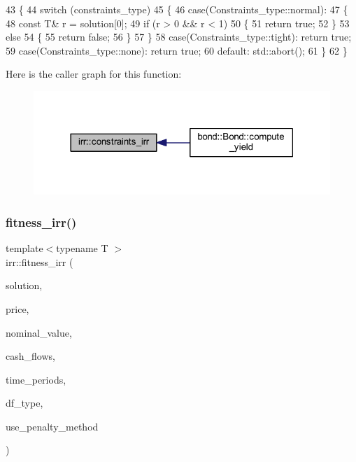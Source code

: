\begin{DoxyCode}
43     \{
44         \textcolor{keywordflow}{switch} (constraints\_type)
45         \{
46         \textcolor{keywordflow}{case}(Constraints\_type::normal):
47         \{
48             \textcolor{keyword}{const} T& r = solution[0];
49             \textcolor{keywordflow}{if} (r > 0 && r < 1)
50             \{
51                 \textcolor{keywordflow}{return} \textcolor{keyword}{true};
52             \}
53             \textcolor{keywordflow}{else}
54             \{
55                 \textcolor{keywordflow}{return} \textcolor{keyword}{false};
56             \}
57         \}
58         \textcolor{keywordflow}{case}(Constraints\_type::tight): \textcolor{keywordflow}{return} \textcolor{keyword}{true};
59         \textcolor{keywordflow}{case}(Constraints\_type::none): \textcolor{keywordflow}{return} \textcolor{keyword}{true};
60             \textcolor{keywordflow}{default}: std::abort();
61         \}
62     \}
\end{DoxyCode}
Here is the caller graph for this function\+:
\nopagebreak
\begin{figure}[H]
\begin{center}
\leavevmode
\includegraphics[width=318pt]{namespaceirr_a6801aa96a307b3f52817dd1a3bcd065e_icgraph}
\end{center}
\end{figure}
\mbox{\label{namespaceirr_aced01c5e5ef9e171a3b892275d442f8d}} 
\subsubsection{\texorpdfstring{fitness\+\_\+irr()}{fitness\_irr()}}
{\footnotesize\ttfamily template$<$typename T $>$ \\
irr\+::fitness\+\_\+irr (\begin{DoxyParamCaption}\item[{const std\+::vector$<$ T $>$ \&}]{solution,  }\item[{const T \&}]{price,  }\item[{const T \&}]{nominal\+\_\+value,  }\item[{const std\+::vector$<$ T $>$ \&}]{cash\+\_\+flows,  }\item[{const std\+::vector$<$ T $>$ \&}]{time\+\_\+periods,  }\item[{const \hyperlink{namespaceutilities_ad4290e607d0651ce53db6e5c776aca7c}{D\+F\+\_\+type} \&}]{df\+\_\+type,  }\item[{const bool \&}]{use\+\_\+penalty\+\_\+method }\end{DoxyParamCaption})}



